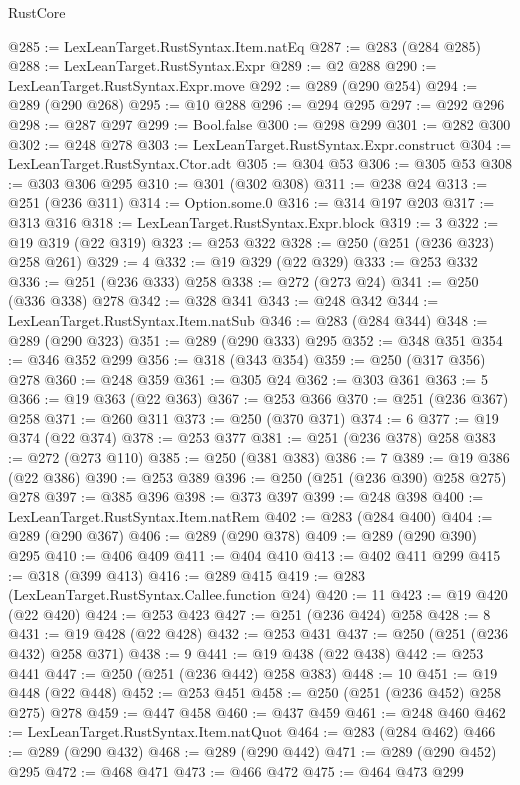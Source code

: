 \begin{lexlean}{RustCore}
\begin{coremodule}
@285 := LexLeanTarget.RustSyntax.Item.natEq
@287 := @283 (@284 @285)
@288 := LexLeanTarget.RustSyntax.Expr
@289 := @2 @288
@290 := LexLeanTarget.RustSyntax.Expr.move
@292 := @289 (@290 @254)
@294 := @289 (@290 @268)
@295 := @10 @288
@296 := @294 @295
@297 := @292 @296
@298 := @287 @297
@299 := Bool.false
@300 := @298 @299
@301 := @282 @300
@302 := @248 @278
@303 := LexLeanTarget.RustSyntax.Expr.construct
@304 := LexLeanTarget.RustSyntax.Ctor.adt
@305 := @304 @53
@306 := @305 @53
@308 := @303 @306 @295
@310 := @301 (@302 @308)
@311 := @238 @24
@313 := @251 (@236 @311)
@314 := Option.some.{0}
@316 := @314 @197 @203
@317 := @313 @316
@318 := LexLeanTarget.RustSyntax.Expr.block
@319 := 3
@322 := @19 @319 (@22 @319)
@323 := @253 @322
@328 := @250 (@251 (@236 @323) @258 @261)
@329 := 4
@332 := @19 @329 (@22 @329)
@333 := @253 @332
@336 := @251 (@236 @333) @258
@338 := @272 (@273 @24)
@341 := @250 (@336 @338) @278
@342 := @328 @341
@343 := @248 @342
@344 := LexLeanTarget.RustSyntax.Item.natSub
@346 := @283 (@284 @344)
@348 := @289 (@290 @323)
@351 := @289 (@290 @333) @295
@352 := @348 @351
@354 := @346 @352 @299
@356 := @318 (@343 @354)
@359 := @250 (@317 @356) @278
@360 := @248 @359
@361 := @305 @24
@362 := @303 @361
@363 := 5
@366 := @19 @363 (@22 @363)
@367 := @253 @366
@370 := @251 (@236 @367) @258
@371 := @260 @311
@373 := @250 (@370 @371)
@374 := 6
@377 := @19 @374 (@22 @374)
@378 := @253 @377
@381 := @251 (@236 @378) @258
@383 := @272 (@273 @110)
@385 := @250 (@381 @383)
@386 := 7
@389 := @19 @386 (@22 @386)
@390 := @253 @389
@396 := @250 (@251 (@236 @390) @258 @275) @278
@397 := @385 @396
@398 := @373 @397
@399 := @248 @398
@400 := LexLeanTarget.RustSyntax.Item.natRem
@402 := @283 (@284 @400)
@404 := @289 (@290 @367)
@406 := @289 (@290 @378)
@409 := @289 (@290 @390) @295
@410 := @406 @409
@411 := @404 @410
@413 := @402 @411 @299
@415 := @318 (@399 @413)
@416 := @289 @415
@419 := @283 (LexLeanTarget.RustSyntax.Callee.function @24)
@420 := 11
@423 := @19 @420 (@22 @420)
@424 := @253 @423
@427 := @251 (@236 @424) @258
@428 := 8
@431 := @19 @428 (@22 @428)
@432 := @253 @431
@437 := @250 (@251 (@236 @432) @258 @371)
@438 := 9
@441 := @19 @438 (@22 @438)
@442 := @253 @441
@447 := @250 (@251 (@236 @442) @258 @383)
@448 := 10
@451 := @19 @448 (@22 @448)
@452 := @253 @451
@458 := @250 (@251 (@236 @452) @258 @275) @278
@459 := @447 @458
@460 := @437 @459
@461 := @248 @460
@462 := LexLeanTarget.RustSyntax.Item.natQuot
@464 := @283 (@284 @462)
@466 := @289 (@290 @432)
@468 := @289 (@290 @442)
@471 := @289 (@290 @452) @295
@472 := @468 @471
@473 := @466 @472
@475 := @464 @473 @299

\end{coremodule}
\end{lexlean}
